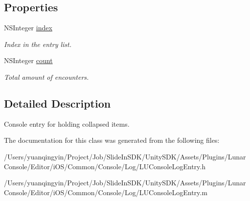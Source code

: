 \subsection*{Properties}
\begin{DoxyCompactItemize}
\item 
\mbox{\label{interface_l_u_console_collapsed_log_entry_a861f6ac7ae133949a01bde02717dd4b6}} 
N\+S\+Integer \mbox{\hyperlink{interface_l_u_console_collapsed_log_entry_a861f6ac7ae133949a01bde02717dd4b6}{index}}
\begin{DoxyCompactList}\small\item\em Index in the entry list. \end{DoxyCompactList}\item 
\mbox{\label{interface_l_u_console_collapsed_log_entry_a2b716a5e7f97c8afb73736e0f5f57b11}} 
N\+S\+Integer \mbox{\hyperlink{interface_l_u_console_collapsed_log_entry_a2b716a5e7f97c8afb73736e0f5f57b11}{count}}
\begin{DoxyCompactList}\small\item\em Total amount of encounters. \end{DoxyCompactList}\end{DoxyCompactItemize}


\subsection{Detailed Description}
Console entry for holding collapsed items. 

The documentation for this class was generated from the following files\+:\begin{DoxyCompactItemize}
\item 
/\+Users/yuanqingyin/\+Project/\+Job/\+Slide\+In\+S\+D\+K/\+Unity\+S\+D\+K/\+Assets/\+Plugins/\+Lunar\+Console/\+Editor/i\+O\+S/\+Common/\+Console/\+Log/L\+U\+Console\+Log\+Entry.\+h\item 
/\+Users/yuanqingyin/\+Project/\+Job/\+Slide\+In\+S\+D\+K/\+Unity\+S\+D\+K/\+Assets/\+Plugins/\+Lunar\+Console/\+Editor/i\+O\+S/\+Common/\+Console/\+Log/L\+U\+Console\+Log\+Entry.\+m\end{DoxyCompactItemize}
